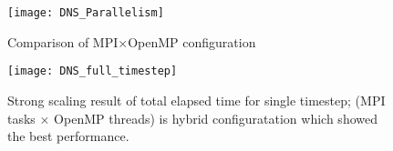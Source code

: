 \begin{figure}[htb]
 \begin{center}
   \texttt{[image: DNS\_Parallelism]}
   \caption{Comparison of MPI$\times$OpenMP configuration}
   \label{fig:DNS_MPI_OpenMP}
 \end{center}
\end{figure}

\begin{figure}[htb]
 \begin{center}
   \texttt{[image: DNS\_full\_timestep]}
   \caption{Strong scaling result of total elapsed time for single timestep; (MPI tasks $\times$ OpenMP threads) is hybrid configuratation which showed  the best performance.}
   \label{fig:DNS_strong_scale_total_elapsed_time}
 \end{center}
\end{figure}







